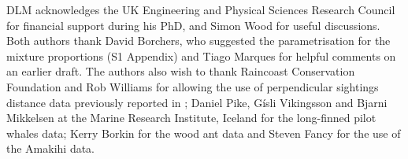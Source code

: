 \documentclass[10pt]{article}
\begin{document}
DLM acknowledges the UK Engineering and Physical Sciences Research Council for financial support during his PhD, and Simon Wood for useful discussions.  Both authors thank David Borchers, who suggested the parametrisation for the mixture proportions (S1 Appendix) and Tiago Marques for helpful comments on an earlier draft. The authors also wish to thank Raincoast Conservation Foundation and Rob Williams for allowing the use of perpendicular sightings distance data previously reported in \cite{Williams:2007tc}; Daniel Pike, G\'{i}sli Vikingsson and Bjarni Mikkelsen at the Marine Research Institute, Iceland for the long-finned pilot whales data; Kerry Borkin for the wood ant data and Steven Fancy for the use of the Amakihi data.

%
\end{document}
